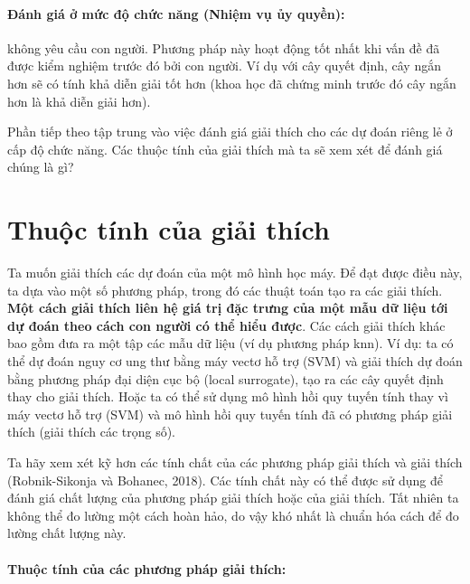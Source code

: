 \paragraph{Đánh giá ở mức độ chức năng (Nhiệm vụ ủy quyền):} không yêu cầu con người. Phương pháp này hoạt động tốt nhất khi vấn đề đã được kiểm nghiệm trước đó bởi con người.  Ví dụ với cây quyết định, cây ngắn hơn sẽ có tính khả diễn giải tốt hơn (khoa học đã chứng minh trước đó cây ngắn hơn là khả diễn giải hơn).


Phần tiếp theo tập trung vào việc đánh giá giải thích cho các dự đoán riêng lẻ ở cấp độ chức năng. Các thuộc tính của giải thích mà ta sẽ xem xét để đánh giá chúng là gì?

\clearpage

\section{Thuộc tính của giải thích}

Ta muốn giải thích các dự đoán của một mô hình học máy. Để đạt được điều này, ta dựa vào một số phương pháp, trong đó các thuật toán tạo ra các giải thích. \textbf{Một cách giải thích liên hệ giá trị đặc trưng của một mẫu dữ liệu tới dự đoán theo cách con người có thể hiểu được}. Các cách giải thích khác bao gồm đưa ra một tập các mẫu dữ liệu (ví dụ phương pháp knn). Ví dụ: ta có thể dự đoán nguy cơ ung thư bằng máy vectơ hỗ trợ (SVM) và giải thích dự đoán bằng phương pháp đại diện cục bộ (local surrogate), tạo ra các cây quyết định thay cho giải thích. Hoặc ta có thể sử dụng mô hình hồi quy tuyến tính thay vì máy vectơ hỗ trợ (SVM) và mô hình hồi quy tuyến tính đã có phương pháp giải thích (giải thích các trọng số).

Ta hãy xem xét kỹ hơn các tính chất của các phương pháp giải thích và giải thích (Robnik-Sikonja và Bohanec, 2018). Các tính chất này có thể được sử dụng để đánh giá chất lượng của phương pháp giải thích hoặc của giải thích. Tất nhiên ta không thể đo lường một cách hoàn hảo, do vậy khó nhất là chuẩn hóa cách để đo lường chất lượng này.

\paragraph{Thuộc tính của các phương pháp giải thích:}

